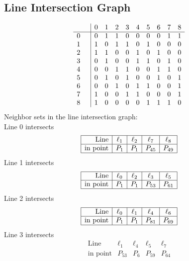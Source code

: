 \documentclass{article}
\begin{document}
{\subsection*{Line Intersection Graph}
{\arraycolsep=1pt
$$
\begin{array}{rr|*{9}r}
 &  & 0 & 1 & 2 & 3 & 4 & 5 & 6 & 7 & 8\\
\hline
0 &  & 0 & 1 & 1 & 0 & 0 & 0 & 0 & 1 & 1\\
1 &  & 1 & 0 & 1 & 1 & 0 & 1 & 0 & 0 & 0\\
2 &  & 1 & 1 & 0 & 0 & 1 & 0 & 1 & 0 & 0\\
3 &  & 0 & 1 & 0 & 0 & 1 & 1 & 0 & 1 & 0\\
4 &  & 0 & 0 & 1 & 1 & 0 & 0 & 1 & 1 & 0\\
5 &  & 0 & 1 & 0 & 1 & 0 & 0 & 1 & 0 & 1\\
6 &  & 0 & 0 & 1 & 0 & 1 & 1 & 0 & 0 & 1\\
7 &  & 1 & 0 & 0 & 1 & 1 & 0 & 0 & 0 & 1\\
8 &  & 1 & 0 & 0 & 0 & 0 & 1 & 1 & 1 & 0\\
\end{array}
$$
}%
Neighbor sets in the line intersection graph:\\
Line 0 intersects 
$$
\begin{array}{|r*{4}{|c}|}
\hline
\mbox{Line}  & \ell_{1} & \ell_{2} & \ell_{7} & \ell_{8}\\
\hline
\mbox{in point}  & P_{1} & P_{1} & P_{45} & P_{49}\\
\hline
\end{array}
$$
Line 1 intersects 
$$
\begin{array}{|r*{4}{|c}|}
\hline
\mbox{Line}  & \ell_{0} & \ell_{2} & \ell_{3} & \ell_{5}\\
\hline
\mbox{in point}  & P_{1} & P_{1} & P_{53} & P_{61}\\
\hline
\end{array}
$$
Line 2 intersects 
$$
\begin{array}{|r*{4}{|c}|}
\hline
\mbox{Line}  & \ell_{0} & \ell_{1} & \ell_{4} & \ell_{6}\\
\hline
\mbox{in point}  & P_{1} & P_{1} & P_{81} & P_{69}\\
\hline
\end{array}
$$
Line 3 intersects 
$$
\begin{array}{|r*{4}{|c}|}
\hline
\mbox{Line}  & \ell_{1} & \ell_{4} & \ell_{5} & \ell_{7}\\
\hline
\mbox{in point}  & P_{53} & P_{6} & P_{59} & P_{64}\\

\end{array}$$}
\end{document}
